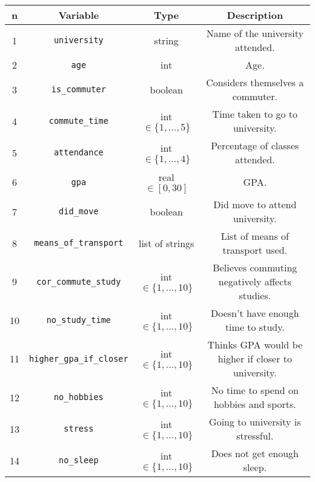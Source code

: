 \documentclass[11pt]{extarticle}
\numberwithin{table}{section}
\numberwithin{figure}{section}
\numberwithin{equation}{section}
\begin{document}
\begin{table}[!ht]
	\centering
	\begin{tabular}{|c|c|c|c|}
		\hline
		\textbf{n} & \textbf{Variable}                & \textbf{Type}              & \textbf{Description}                                \\
		\hline
		1          & \texttt{university}              & string                     & Name of the university attended.                    \\
		2          & \texttt{age}                     & int                        & Age.                                                \\
		3          & \texttt{is\_commuter}            & boolean                    & Considers themselves a commuter.                    \\
		4          & \texttt{commute\_time}           & int $\in \{1, \dots, 5\}$  & Time taken to go to university.                     \\
		5          & \texttt{attendance}              & int $\in \{1, \dots, 4\}$  & Percentage of classes attended.                     \\
		6          & \texttt{gpa}                     & real $\in [0,30]$          & GPA.                                                \\
		7          & \texttt{did\_move}               & boolean                    & Did move to attend university.                      \\
		8          & \texttt{means\_of\_transport}    & list of strings            & List of means of transport used.                    \\
		9          & \texttt{cor\_commute\_study}     & int $\in \{1, \dots, 10\}$ & Believes commuting negatively affects studies.      \\
		10         & \texttt{no\_study\_time}         & int $\in \{1, \dots, 10\}$ & Doesn't have enough time to study.                  \\
		11         & \texttt{higher\_gpa\_if\_closer} & int $\in \{1, \dots, 10\}$ & Thinks GPA would be higher if closer to university. \\
		12         & \texttt{no\_hobbies}             & int $\in \{1, \dots, 10\}$ & No time to spend on hobbies and sports.             \\
		13         & \texttt{stress}                  & int $\in \{1, \dots, 10\}$ & Going to university is stressful.                   \\
		14         & \texttt{no\_sleep}               & int $\in \{1, \dots, 10\}$ & Does not get enough sleep.                          \\

\end{tabular}
\end{table}
\end{document}
